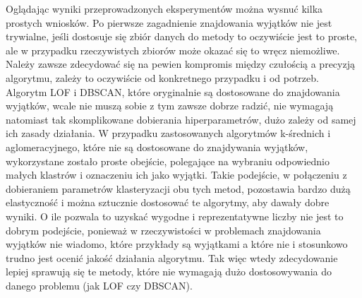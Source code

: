 \documentclass{classrep}
\begin{document}
{        Oglądając wyniki przeprowadzonych eksperymentów można wysnuć kilka prostych
        wniosków. Po pierwsze zagadnienie znajdowania wyjątków nie jest trywialne,
        jeśli dostosuje się zbiór danych do metody to oczywiście jest to proste, ale w
        przypadku rzeczywistych zbiorów może okazać się to wręcz niemożliwe. Należy
        zawsze zdecydować się na pewien kompromis między czułością a precyzją
        algorytmu, zależy to oczywiście od konkretnego przypadku i od potrzeb. Algorytm
        LOF i DBSCAN, które oryginalnie są dostosowane do znajdowania wyjątków, wcale
        nie muszą sobie z tym zawsze dobrze radzić, nie wymagają natomiast tak
        skomplikowane dobierania hiperparametrów, dużo zależy od samej ich zasady
        działania. W przypadku zastosowanych algorytmów k-średnich i aglomeracyjnego,
        które nie są dostosowane do znajdywania wyjątków, wykorzystane zostało proste
        obejście, polegające na wybraniu odpowiednio małych klastrów i oznaczeniu ich
        jako wyjątki. Takie podejście, w połączeniu z dobieraniem parametrów
        klasteryzacji obu tych metod, pozostawia bardzo dużą elastyczność i można
        sztucznie dostosować te algorytmy, aby dawały dobre wyniki. O ile pozwala to
        uzyskać wygodne i reprezentatywne liczby nie jest to dobrym podejście, ponieważ
        w rzeczywistości w problemach znajdowania wyjątków nie wiadomo, które przykłady
        są wyjątkami a które nie i stosunkowo trudno jest ocenić jakość działania
        algorytmu. Tak więc wtedy zdecydowanie lepiej sprawują się te metody, które nie
        wymagają dużo dostosowywania do danego problemu (jak LOF czy DBSCAN).
    }

    \begin{thebibliography}{0}
    \end{thebibliography}
\end{document}

